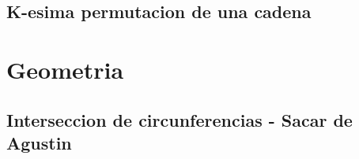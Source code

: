 \subsection{K-esima permutacion de una cadena}



\section{Geometria}
\subsection{Interseccion de circunferencias - Sacar de Agustin}

